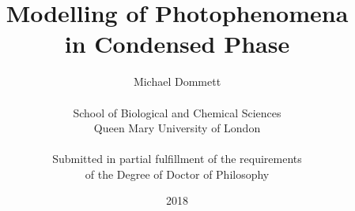 \documentclass[a4paper]{report}
\begin{document}
\setlength{\TPHorizModule}{200mm} 
\setlength{\TPVertModule}{100mm} 
\textblockorigin{61mm}{19mm}



\onehalfspace{}


\providecommand{\OT}[1]{\operatorname{\Theta}\bigl(#1\bigr)}
\providecommand{\OOm}[1]{\operatorname{\Omega}\bigl(#1\bigr)}


\title{\huge
\textbf{Modelling of Photophenomena\\ in Condensed Phase}}
\author{Michael Dommett \\
\\
School of Biological and Chemical Sciences\\
Queen Mary University of London\\
\\
Submitted in partial fulfillment of the requirements\\ of the Degree of Doctor of Philosophy}

\date{2018}



%  

\setcounter{page}{3}

%
%
%

%




\end{document}
